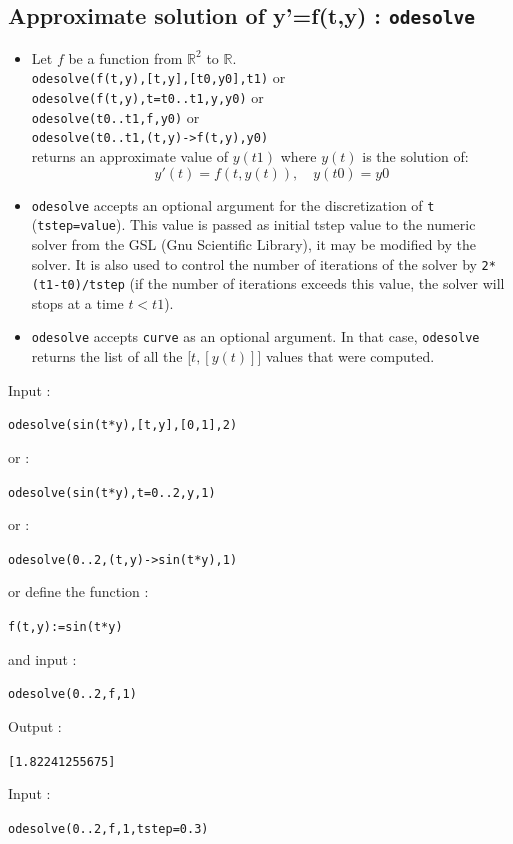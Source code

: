\documentclass[a4paper,11pt]{book}
\begin{document}
\subsection{Approximate solution of y'=f(t,y) : {\tt odesolve}}
\label{ssec:odesolve}
\begin{itemize}
\item Let $f$ be a function from $\mathbb R^2$ to $\mathbb R$.\\
 {\tt odesolve(f(t,y),[t,y],[t0,y0],t1)} or\\
{\tt odesolve(f(t,y),t=t0..t1,y,y0)} or\\
{\tt odesolve(t0..t1,f,y0)} or\\
{\tt odesolve(t0..t1,(t,y)->f(t,y),y0)}\\
returns an approximate value of $y(t1)$ where $y(t)$ is the  
solution of:
\[ y'(t)=f(t,y(t)), \quad  y(t0)=y0 \]
\item {\tt odesolve} accepts an optional argument for the 
discretization of {\tt t} ({\tt tstep=value}). 
This value is passed as initial tstep value to the numeric solver
from the GSL (Gnu Scientific Library), it may be modified
by the solver. It is also used to control the number of iterations
of the solver by {\tt 2*(t1-t0)/tstep} (if the number
of iterations exceeds this value, the solver will stops at a time $t<t1$).
\item {\tt odesolve} accepts {\tt curve} as an optional argument.
In that case, 
{\tt odesolve} returns the list of all the [$t,[y(t)]$] values
that were computed.
\end{itemize}
Input :
\begin{center}{\tt odesolve(sin(t*y),[t,y],[0,1],2)}\end{center}
or :
\begin{center}{\tt odesolve(sin(t*y),t=0..2,y,1)}\end{center}
or :
\begin{center}{\tt odesolve(0..2,(t,y)->sin(t*y),1)}\end{center}
or define the function :
\begin{center}{\tt f(t,y):=sin(t*y)} \end{center}
and input :
\begin{center}{\tt odesolve(0..2,f,1)}\end{center}
Output :
\begin{center}{\tt [1.82241255675]}\end{center}
Input :
\begin{center}{\tt odesolve(0..2,f,1,tstep=0.3)}\end{center}
\end{document}
